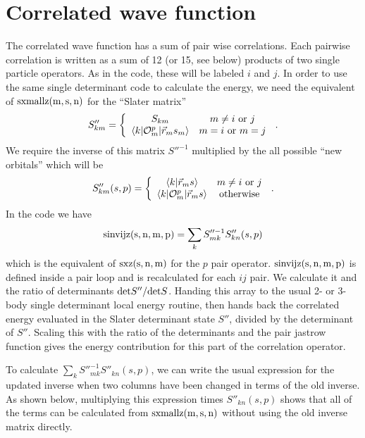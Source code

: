 \documentclass[12pt]{article}
\begin{document}
\section{Correlated wave function}
The correlated wave function has a sum of pair wise correlations.
Each pairwise correlation is written as a sum of 12 (or 15, see below)
products of two single particle operators. As in the code, these
will be labeled $i$ and $j$. In order to use the same single determinant
code to calculate the energy, we need the equivalent of
${\rm sxmallz(m,s,n)}$ for the ``Slater matrix''
\begin{equation}
S''_{km} = \left \{
\begin{array}{cc}
S_{km} & m \neq i\ {\rm or}\ j\\
\langle k|{\cal O}^p_m|\vec r_m s_m\rangle & m = i\ {\rm or}\ m = j
\end{array}
\right . \,.
\end{equation}
We require the inverse of this matrix $S''^{-1}$ multiplied by the
all possible ``new orbitals'' which will be
\begin{equation}
\label{eq6}
S''_{km}(s,p)= \left \{
\begin{array}{cc}
\langle k|\vec r_m s\rangle & m\neq i\ {\rm or}\ j\\
\langle k|{\cal O}^p_m|\vec r_m s\rangle &  {\rm otherwise}\\
\end{array}
\right . \,.
\end{equation}
In the code we have
\begin{equation}
\label{eq7}
{\rm sinvijz(s,n,m,p)}=\sum_k S''^{-1}_{mk} S''_{kn}(s,p)
\end{equation}
which is the equivalent of ${\rm sxz(s,n,m)}$ for the $p$ pair operator.
${\rm sinvijz(s,n,m,p)}$ is defined inside a pair loop and is recalculated
for each $ij$ pair. We calculate it and the ratio of determinants
${\rm det} S''/{\rm det}S$. Handing this array to the usual 2- or 3-body
single determinant local energy routine, then hands back the correlated
energy evaluated in the Slater determinant state $S''$, divided by the
determinant of $S''$. Scaling this with the ratio of the determinants
and the pair jastrow function gives the energy contribution for this
part of the correlation operator.

To calculate
$\sum_k S''^{-1}_{mk} S''_{kn}(s,p)$, we can write the usual expression
for the updated inverse when two columns have been changed
in terms of the old inverse. As shown below, multiplying this expression
times $S''_{kn}(s,p)$ shows that all of the terms can be calculated from
${\rm sxmallz(m,s,n)}$ without using the old inverse matrix directly.
\end{document}
